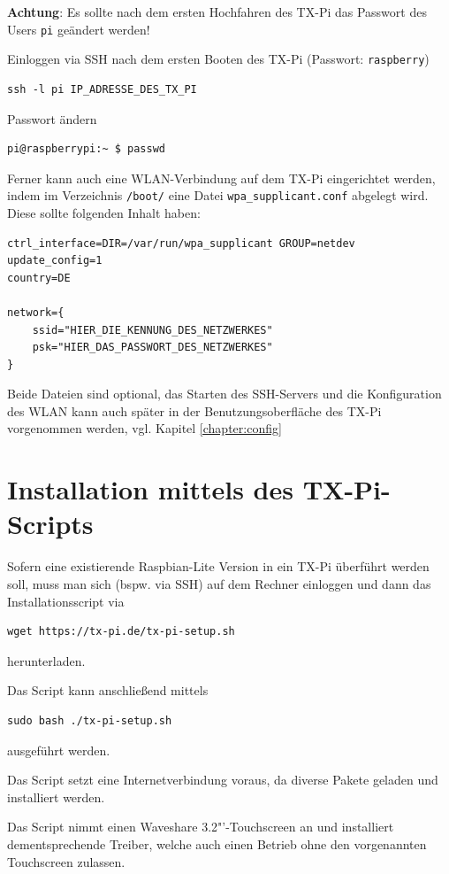 \documentclass[
  paper=A4,
  ngerman,
  fontsize=12pt,
  parskip=half-,
]{scrbook}
\begin{document}
\textbf{Achtung}: Es sollte nach dem ersten Hochfahren des TX-Pi
das Passwort des Users \texttt{pi} geändert werden!

Einloggen via SSH nach dem ersten Booten des TX-Pi (Passwort: \texttt{raspberry})
\begin{lstlisting}
ssh -l pi IP_ADRESSE_DES_TX_PI
\end{lstlisting}

Passwort ändern
\begin{lstlisting}
pi@raspberrypi:~ $ passwd
\end{lstlisting}

Ferner kann auch eine WLAN-Verbindung auf dem TX-Pi eingerichtet 
werden, indem im Verzeichnis \texttt{/boot/} eine Datei 
\texttt{wpa\_supplicant.conf} abgelegt wird. 
Diese sollte folgenden Inhalt haben:
\begin{lstlisting}
ctrl_interface=DIR=/var/run/wpa_supplicant GROUP=netdev
update_config=1
country=DE

network={
    ssid="HIER_DIE_KENNUNG_DES_NETZWERKES"
    psk="HIER_DAS_PASSWORT_DES_NETZWERKES"
}
\end{lstlisting}

Beide Dateien sind optional, das Starten des SSH-Servers und
die Konfiguration des WLAN kann auch später in der Benutzungsoberfläche
des TX-Pi vorgenommen werden, vgl. Kapitel \ref{chapter:config}


\section{Installation mittels des TX-Pi-Scripts}

Sofern eine existierende Raspbian-Lite Version in ein TX-Pi
überführt werden soll, muss man sich (bspw. via SSH) auf dem 
Rechner einloggen und dann das Installationsscript via
\begin{lstlisting}
wget https://tx-pi.de/tx-pi-setup.sh
\end{lstlisting}
herunterladen.

Das Script kann anschließend mittels
\begin{lstlisting}
sudo bash ./tx-pi-setup.sh
\end{lstlisting}
ausgeführt werden.

Das Script setzt eine Internetverbindung voraus, da diverse Pakete geladen und
installiert werden.

Das Script nimmt einen Waveshare 3.2"'-Touchscreen an und installiert
dementsprechende Treiber, welche auch einen Betrieb ohne den vorgenannten
Touchscreen zulassen.
\end{document}
